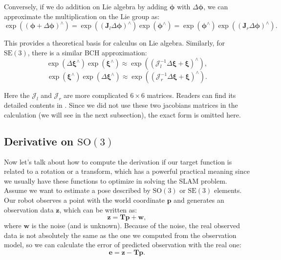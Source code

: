 Conversely, if we do addition on Lie algebra by adding $\boldsymbol{\phi}$ with $\Delta \boldsymbol{\phi}$, we can approximate the multiplication on the Lie group as:
\begin{equation}
\exp \left( {{{\left( { \boldsymbol{\phi} + \Delta \boldsymbol{\phi} } \right)}^ \wedge }} \right) = \exp \left( {{{\left( {{ \mathbf{J}_l}\Delta \boldsymbol{\phi} } \right)}^ \wedge }} \right)\exp \left( {{ \boldsymbol{\phi} ^ \wedge }} \right) = \exp \left( {{\boldsymbol{\phi} ^ \wedge }} \right)\exp \left( {{{\left( {{\mathbf{J}_r}\Delta \boldsymbol{ \phi} } \right)}^ \wedge }} \right).
\end{equation}

This provides a theoretical basis for calculus on Lie algebra. Similarly, for $\mathrm{SE}(3)$, there is a similar BCH approximation:
\begin{equation}
\exp \left( {\Delta {\boldsymbol{\xi} ^ \wedge }} \right)\exp \left( {{ \boldsymbol{\xi} ^ \wedge }} \right) \approx \exp \left ( {{{\left( {{ \boldsymbol{\mathcal{J}}_l^{-1} }\Delta \boldsymbol{\xi} + \boldsymbol{\xi} } \right)}^ \wedge }} \right),
\end{equation}
\begin{equation}
\exp \left( {{ \boldsymbol{\xi} ^ \wedge }} \right) \exp \left( {\Delta {\boldsymbol{\xi} ^ \wedge }} \right) \approx \exp \left ( {{{\left( {{ \boldsymbol{\mathcal{J}}_r^{-1} }\Delta \boldsymbol{\xi} + \boldsymbol{\xi} } \right)}^ \wedge }} \right).
\end{equation}

Here the $\boldsymbol{\mathcal{J}}_l$ and $\boldsymbol{\mathcal{J}}_r$ are more complicated $6 \times 6$ matrices. Readers can find its detailed contents in \cite{Barfoot2016}. Since we did not use these two jacobians matrices in the calculation (we will see in the next subsection), the exact form is omitted here.

\subsection{Derivative on $\mathrm{SO}(3)$}
Now let's talk about how to compute the derivation if our target function is related to a rotation or a transform, which has a powerful practical meaning since we usually have these functions to optimize in solving the SLAM problem. Assume we want to estimate a pose described by $\mathrm{SO}(3)$ or $\mathrm{SE}(3)$ elements. Our robot observes a point with the world coordinate $\mathbf{p}$ and generates an observation data $\mathbf{z}$, which can be written as:
\begin{equation}
\mathbf{z} = \mathbf{T} \mathbf{p} + \mathbf{w},
\end{equation}
where $\mathbf{w}$ is the noise (and is unknown). Because of the noise, the real observed data is not absolutely the same as the one we computed from the observation model, so we can calculate the error of predicted observation with the real one: 
\begin{equation}
\mathbf{e} = \mathbf{z} - \mathbf{T} \mathbf{p}.
\end{equation}

